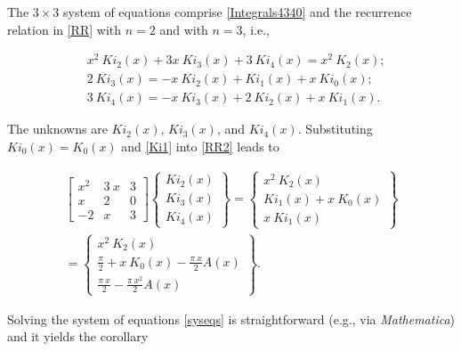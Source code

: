 \documentclass[pdflatex,sn-mathphys-num]{sn-jnl}%
\theoremstyle{thmstyleone}%
\theoremstyle{thmstyletwo}%
\theoremstyle{thmstylethree}%
\begin{document}
The $3\times 3$ system of equations comprise \eqref{Integrals4340} and the recurrence relation in \eqref{RR} with $n=2$ and with $n=3$, i.e.,

\begin{equation}
\begin{split}
& x^2\:Ki_2(x) + 3x\:Ki_3(x) + 3\:Ki_4(x) = x^2\:K_2(x);\\
& 2\:Ki_{3}(x) = -x\:Ki_2(x) + Ki_{1}(x) + x\:Ki_{0}(x) ;\\
& 3\:Ki_{4}(x) = -x\:Ki_3(x) + 2\:Ki_{2}(x) + x\:Ki_{1}(x).
\end{split}
\label{RR2}
\end{equation}

The unknowns are $Ki_2(x)$, $Ki_3(x)$, and $Ki_4(x)$. Substituting $Ki_0(x)=  K_0(x)$ and \eqref{Ki1} into \eqref{RR2} leads to

\begin{equation}
\begin{gathered}
\begin{bmatrix} 
x^2 & 3\:x & 3 \\
x & 2 & 0 \\ 
-2 & x & 3
\end{bmatrix} 
\begin{Bmatrix} 
Ki_2(x)\\
Ki_3(x)\\
Ki_4(x)
\end{Bmatrix} 
= 
\begin{Bmatrix} 
x^2\:K_2(x) \\ 
Ki_1(x)+x \:K_0(x) \\
x \:Ki_1(x)
\end{Bmatrix}\\
=
\begin{Bmatrix} 
x^2\:K_2(x) \\ 
\frac{\pi}{2} + x\:K_0(x) - \frac{\pi\:x}{2} A(x) \\
\frac{\pi\:x}{2}  - \frac{\pi\:x^2}{2} A(x)  
\end{Bmatrix}.
\end{gathered}
\label{syseqs}
\end{equation}

Solving the system of equations \eqref{syseqs} is straightforward (e.g., via \emph{Mathematica}) and it yields the corollary
\end{document}
